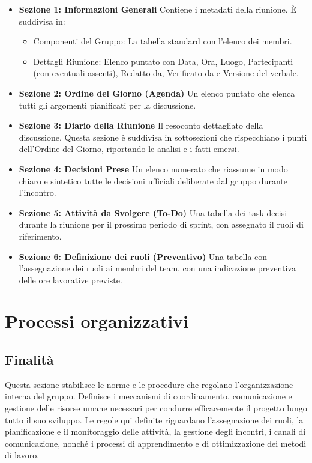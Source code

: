 \documentclass[a4paper, 11pt, oneside]{scrartcl} %
\begin{document}
\begin{itemize}
\item \textbf{Sezione 1: Informazioni Generali}
    Contiene i metadati della riunione.
    È suddivisa in:
    \begin{itemize}
        \item Componenti del Gruppo: La tabella standard con l'elenco dei membri.
        \item Dettagli Riunione: Elenco puntato con Data, Ora, Luogo, Partecipanti (con eventuali assenti), Redatto da, Verificato da e Versione del verbale.
    \end{itemize}
\item \textbf{Sezione 2: Ordine del Giorno{\scriptsize{}} (Agenda)}
    Un elenco puntato che elenca tutti gli argomenti pianificati per la discussione.
\item \textbf{Sezione 3: Diario della Riunione}{\scriptsize{}}
    Il resoconto dettagliato della discussione.
    Questa sezione è suddivisa in sottosezioni che rispecchiano i punti dell'Ordine del Giorno, riportando le analisi e i fatti emersi.
\item \textbf{Sezione 4: Decisioni Prese}
    Un elenco numerato che riassume in modo chiaro e sintetico tutte le decisioni ufficiali deliberate dal gruppo durante l'incontro.
\item \textbf{Sezione 5: Attività da Svolgere (To-Do)}
    Una tabella dei task decisi durante la riunione per il prossimo periodo di sprint, con assegnato il ruoli di riferimento.
\item \textbf{Sezione 6: Definizione dei ruoli (Preventivo)}
    Una tabella con l'assegnazione dei ruoli ai membri del team, con una indicazione preventiva delle ore lavorative previste.
\end{itemize}


\newpage
\section{Processi organizzativi}
\label{sec:processi_organizzativi}

\subsection{Finalità}
Questa sezione stabilisce le norme e le procedure che regolano l'organizzazione interna del gruppo.
Definisce i meccanismi di coordinamento, comunicazione e gestione delle risorse umane necessari per condurre efficacemente il progetto lungo tutto il suo sviluppo.
Le regole qui definite riguardano l'assegnazione dei ruoli, la pianificazione e il monitoraggio delle attività, la gestione degli incontri, i canali di comunicazione, nonché i processi di apprendimento e di ottimizzazione dei metodi di lavoro.
\end{document}
